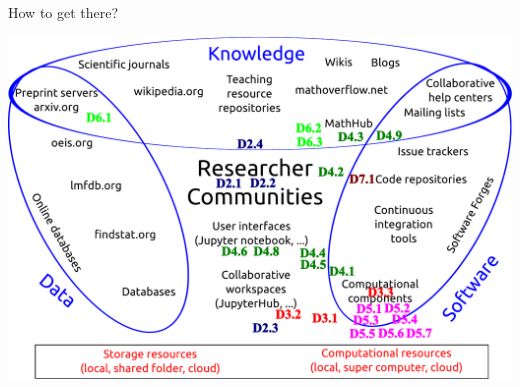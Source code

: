 \documentclass{beamer}
\begin{document}
\begin{frame}{How to get there?}
  \centerline{\includegraphics[height=.85\textheight]{TheBigPictureDeliverables.pdf}}
\end{frame}
\end{document}
